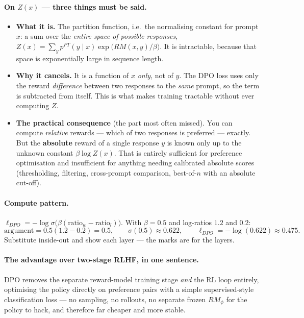 \documentclass[11pt,a4paper]{article}
\begin{document}
\paragraph{On $Z(x)$ --- three things must be said.}
\begin{itemize}
\item \textbf{What it is.} The partition function, i.e.\ the normalising
constant for prompt $x$: a sum over the \emph{entire space of possible
responses},
$Z(x)=\sum_y p^{PT}(y\mid x)\exp\bigl(RM(x,y)/\beta\bigr)$. It is
intractable, because that space is exponentially large in sequence length.
\item \textbf{Why it cancels.} It is a function of $x$ \emph{only}, not of
$y$. The DPO loss uses only the reward \emph{difference} between two
responses to the \emph{same} prompt, so the term is subtracted from itself.
This is what makes training tractable without ever computing $Z$.
\item \textbf{The practical consequence} (the part most often missed). You
can compute \emph{relative} rewards --- which of two responses is preferred
--- exactly. But the \textbf{absolute} reward of a single response $y$ is
known only up to the unknown constant $\beta\log Z(x)$. That is entirely
sufficient for preference optimisation and insufficient for anything needing
calibrated absolute scores (thresholding, filtering, cross-prompt
comparison, best-of-$n$ with an absolute cut-off).
\end{itemize}

\paragraph{Compute pattern.} $\ell_{DPO}=-\log\sigma\bigl(\beta(\text{ratio}_w-\text{ratio}_l)\bigr)$.
With $\beta=0.5$ and log-ratios $1.2$ and $0.2$:
\[
\text{argument}=0.5(1.2-0.2)=0.5,\qquad
\sigma(0.5)\approx0.622,\qquad
\ell_{DPO}=-\log(0.622)\approx \mathbf{0.475}.
\]
Substitute inside-out and show each layer --- the marks are for the layers.

\paragraph{The advantage over two-stage RLHF, in one sentence.} DPO removes
the separate reward-model training stage \emph{and} the RL loop entirely,
optimising the policy directly on preference pairs with a simple
supervised-style classification loss --- no sampling, no rollouts, no separate
frozen $RM_\phi$ for the policy to hack, and therefore far cheaper and more
stable.
\end{document}
